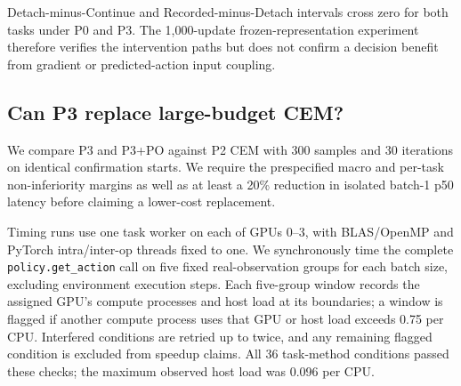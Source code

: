 Detach-minus-Continue and Recorded-minus-Detach intervals cross zero for both tasks under P0 and P3. The 1,000-update frozen-representation experiment therefore verifies the intervention paths but does not confirm a decision benefit from gradient or predicted-action input coupling.

\begin{table}[t]
 \centering\small
 
 \caption{Paired short-training effects in percentage points. Training contrasts use state-cluster intervals; the two primary contrasts, Detach-minus-Continue and Recorded-minus-Detach, are Holm-corrected as a family. Continue-minus-Frozen is shown as an exploratory extra-training contrast.}
 \label{tab:reference_phase16_training_effects}
\end{table}

\subsection{Can P3 replace large-budget CEM?}
We compare P3 and P3+PO against P2 CEM with 300 samples and 30 iterations on identical confirmation starts. We require the prespecified macro and per-task non-inferiority margins as well as at least a 20\% reduction in isolated batch-1 p50 latency before claiming a lower-cost replacement.

Timing runs use one task worker on each of GPUs 0--3, with BLAS/OpenMP and PyTorch intra/inter-op threads fixed to one. We synchronously time the complete \texttt{policy.get\_action} call on five fixed real-observation groups for each batch size, excluding environment execution steps. Each five-group window records the assigned GPU's compute processes and host load at its boundaries; a window is flagged if another compute process uses that GPU or host load exceeds 0.75 per CPU. Interfered conditions are retried up to twice, and any remaining flagged condition is excluded from speedup claims. All 36 task-method conditions passed these checks; the maximum observed host load was 0.096 per CPU.

\begin{table}[t]
 \centering\small
 
 \caption{Paired success differences from the large-budget P2 CEM reference. Negative values indicate lower success for the flow-based method.}
 \label{tab:reference_phase16_cem}
\end{table}

\begin{table}[t]
 \centering\small
 
 \caption{Per-task isolated batch-1 planning p50/p95 latency in milliseconds. All reported timing conditions passed the GPU and host-pressure checks.}
 \label{tab:reference_phase16_latency}
\end{table}

